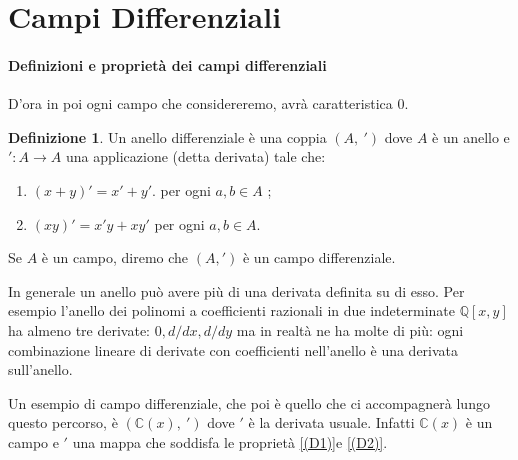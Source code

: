 \documentclass[10pt,oneside]{article}
\theoremstyle{definition}
\theoremstyle{plain}
\theoremstyle{definition}
\newtheorem{dfn}{Definizione}
\theoremstyle{plain}
\theoremstyle{plain}
\newcommand{\Q}{\mathbb{Q}}
\newcommand{\C}{\mathbb{C}}
\begin{document}
\section{Campi Differenziali}

\paragraph{Definizioni e proprietà dei campi differenziali}

D'ora in poi ogni campo che considereremo, avrà caratteristica 0.


\begin{dfn}
Un anello differenziale è una coppia $(A,\ ')$ dove $A$ è un anello e $':A \to A$ una applicazione (detta derivata) tale che:
\begin{enumerate}[label=(D\arabic*)]
\item \label{(D1)}   $(x+y)'=x'+y'. $ per ogni $a,b \in A$ ;
\item \label{(D2)}  $(xy)'=x'y+xy'$ per ogni $a,b \in A$. 
\end{enumerate}
Se $A$ è un campo, diremo che $(A, ')$ è un campo differenziale.
\end{dfn}
In generale un anello può avere più di una derivata definita su di esso. Per esempio l'anello  dei polinomi a coefficienti razionali in due indeterminate $\Q[x,y]$ ha almeno tre derivate: $0, d/dx, d/dy$ ma in realtà ne ha molte di più: ogni combinazione lineare di derivate con coefficienti nell'anello è una derivata sull'anello.




Un esempio di campo differenziale, che poi è quello che ci accompagnerà lungo questo percorso, è $(\C(x),\ ')$ dove $'$ è la derivata usuale. Infatti $\C(x)$ è un campo e $'$ una mappa che soddisfa le proprietà \ref{(D1)}e \ref{(D2)}. 
\end{document}
